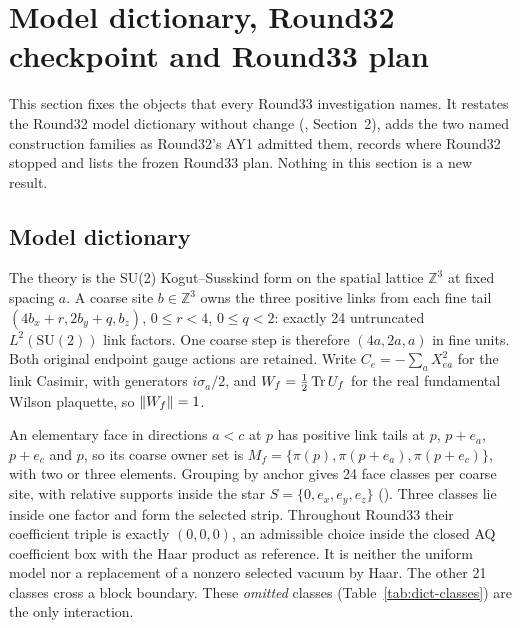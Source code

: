 \section{Model dictionary, Round32 checkpoint and Round33 plan}
\label{sec:model}

This section fixes the objects that every Round33 investigation names. It
restates the Round32 model dictionary without change
(, Section~2), adds
the two named construction families as Round32's AY1 admitted them, records
where Round32 stopped and lists the frozen Round33 plan. Nothing in this
section is a new result.

\subsection{Model dictionary}
\label{sec:dictionary}

The theory is the SU(2) Kogut--Susskind form \cite{ks} on the spatial lattice
$\mathbb Z^3$ at fixed spacing $a$. A coarse site $b\in\mathbb Z^3$ owns the
three positive links from each fine tail $(4b_x+r,2b_y+q,b_z)$, $0\le r<4$,
$0\le q<2$: exactly 24 untruncated $L^2(\mathrm{SU}(2))$ link factors. One
coarse step is therefore $(4a,2a,a)$ in fine units. Both original endpoint
gauge actions are retained. Write $C_e=-\sum_aX_{ea}^2$ for the link Casimir,
with generators $i\sigma_a/2$, and $W_f=\tfrac12\operatorname{Tr} U_f$ for the real
fundamental Wilson plaquette, so $\left\lVert W_f\right\rVert=1$.

An elementary face in directions $a<c$ at $p$ has positive link tails at $p$,
$p+e_a$, $p+e_c$ and $p$, so its coarse owner set is
$M_f=\{\pi(p),\pi(p+e_a),\pi(p+e_c)\}$, with two or three elements. Grouping
by anchor gives 24 face classes per coarse site, with relative supports inside
the star $S=\{0,e_x,e_y,e_z\}$
(). Three classes
lie inside one factor and form the selected strip. Throughout Round33 their
coefficient triple is exactly $(0,0,0)$, an admissible choice inside the
closed AQ coefficient box with the Haar product as reference. It is neither
the uniform model nor a replacement of a nonzero selected vacuum by Haar. The
other 21 classes cross a block boundary. These \emph{omitted} classes
(Table~\ref{tab:dict-classes}) are the only interaction.

